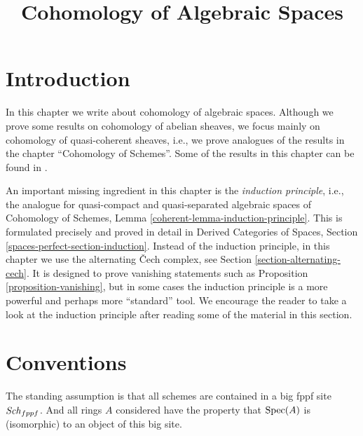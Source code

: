 

%


\title{Cohomology of Algebraic Spaces}

\maketitle

\label{section-phantom}

\tableofcontents




\section{Introduction}
\label{section-introduction}

\noindent
In this chapter we write about cohomology of algebraic spaces.
Although we prove some results on cohomology of abelian sheaves,
we focus mainly on cohomology of quasi-coherent sheaves, i.e.,
we prove analogues of the results in the chapter ``Cohomology of Schemes''.
Some of the results in this chapter can be found in \cite{Kn}.

\medskip\noindent
An important missing ingredient in this chapter is the
{\it induction principle}, i.e., the analogue for quasi-compact
and quasi-separated algebraic spaces of
Cohomology of Schemes, Lemma \ref{coherent-lemma-induction-principle}.
This is formulated precisely and proved in detail in
Derived Categories of Spaces, Section \ref{spaces-perfect-section-induction}.
Instead of the induction principle, in this chapter we use the
alternating {\v C}ech complex, see
Section \ref{section-alternating-cech}.
It is designed to prove vanishing statements such as
Proposition \ref{proposition-vanishing},
but in some cases the induction principle is a more powerful
and perhaps more ``standard'' tool. We encourage the reader
to take a look at the induction principle
after reading some of the material in this section.



\section{Conventions}
\label{section-conventions}

\noindent
The standing assumption is that all schemes are contained in
a big fppf site $\mathit{Sch}_{fppf}$. And all rings $A$ considered
have the property that $\mathop{\mathrm{Spec}}(A)$ is (isomorphic) to an
object of this big site.

